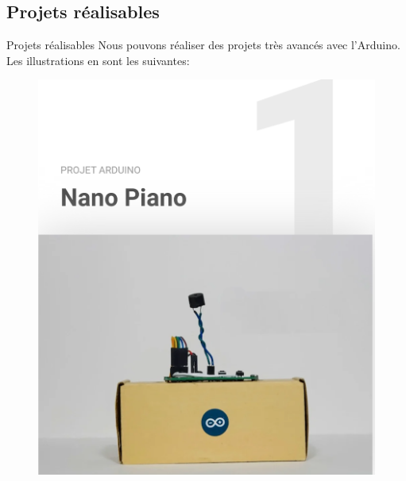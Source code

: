 \documentclass[]{beamer}
\begin{document}
	\subsection{Projets réalisables}
	\begin{frame}
		{Projets réalisables}
		Nous pouvons réaliser des projets très avancés avec l'Arduino.
		Les illustrations en sont les suivantes:
		
			\begin{figure}
				\begin{center}
					\includegraphics[scale=0.4]{piano_arduino.png}
				\end{center}
			\end{figure}
	\end{frame}
\end{document}
